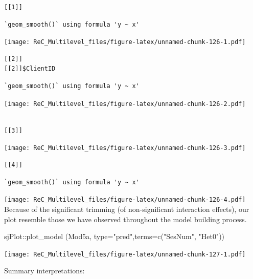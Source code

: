 \documentclass[
  11pt,
]{book}
\newenvironment{Shaded}{\begin{snugshade}}{\end{snugshade}}
\newcommand{\AttributeTok}[1]{\textcolor[rgb]{0.77,0.63,0.00}{#1}}
\newcommand{\FunctionTok}[1]{\textcolor[rgb]{0.00,0.00,0.00}{#1}}
\newcommand{\NormalTok}[1]{#1}
\newcommand{\SpecialCharTok}[1]{\textcolor[rgb]{0.00,0.00,0.00}{#1}}
\newcommand{\StringTok}[1]{\textcolor[rgb]{0.31,0.60,0.02}{#1}}
\begin{document}
\begin{verbatim}
[[1]]
\end{verbatim}

\begin{verbatim}
`geom_smooth()` using formula 'y ~ x'
\end{verbatim}

\texttt{[image: ReC\_Multilevel\_files/figure-latex/unnamed-chunk-126-1.pdf]}

\begin{verbatim}
[[2]]
[[2]]$ClientID
\end{verbatim}

\begin{verbatim}
`geom_smooth()` using formula 'y ~ x'
\end{verbatim}

\texttt{[image: ReC\_Multilevel\_files/figure-latex/unnamed-chunk-126-2.pdf]}

\begin{verbatim}

[[3]]
\end{verbatim}

\texttt{[image: ReC\_Multilevel\_files/figure-latex/unnamed-chunk-126-3.pdf]}

\begin{verbatim}
[[4]]
\end{verbatim}

\begin{verbatim}
`geom_smooth()` using formula 'y ~ x'
\end{verbatim}

\texttt{[image: ReC\_Multilevel\_files/figure-latex/unnamed-chunk-126-4.pdf]}
Because of the significant trimming (of non-significant interaction effects), our plot resemble those we have observed throughout the model building process.

\begin{Shaded}
\begin{Highlighting}[]
\NormalTok{sjPlot}\SpecialCharTok{::}\FunctionTok{plot\_model}\NormalTok{ (Mod5a, }\AttributeTok{type=}\StringTok{"pred"}\NormalTok{,}\AttributeTok{terms=}\FunctionTok{c}\NormalTok{(}\StringTok{"SesNum"}\NormalTok{, }\StringTok{"Het0"}\NormalTok{))}
\end{Highlighting}
\end{Shaded}

\texttt{[image: ReC\_Multilevel\_files/figure-latex/unnamed-chunk-127-1.pdf]}

Summary interpretations:
\end{document}

